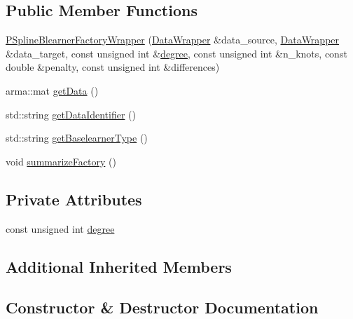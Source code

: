 \subsection*{Public Member Functions}
\begin{DoxyCompactItemize}
\item 
\mbox{\hyperlink{class_p_spline_blearner_factory_wrapper_a3ff597f06068aa467bd6646d267fb861}{P\+Spline\+Blearner\+Factory\+Wrapper}} (\mbox{\hyperlink{class_data_wrapper}{Data\+Wrapper}} \&data\+\_\+source, \mbox{\hyperlink{class_data_wrapper}{Data\+Wrapper}} \&data\+\_\+target, const unsigned int \&\mbox{\hyperlink{class_p_spline_blearner_factory_wrapper_ac19835801a7c185a7a86749c7dcfaf18}{degree}}, const unsigned int \&n\+\_\+knots, const double \&penalty, const unsigned int \&differences)
\item 
arma\+::mat \mbox{\hyperlink{class_p_spline_blearner_factory_wrapper_a7613c56ca05f36f8365a1d5987bbf823}{get\+Data}} ()
\item 
std\+::string \mbox{\hyperlink{class_p_spline_blearner_factory_wrapper_a909646ea1efe420d71c8159ab2305fc8}{get\+Data\+Identifier}} ()
\item 
std\+::string \mbox{\hyperlink{class_p_spline_blearner_factory_wrapper_a13ca216f7c9673bb66598c9be0e44b03}{get\+Baselearner\+Type}} ()
\item 
void \mbox{\hyperlink{class_p_spline_blearner_factory_wrapper_a930b000d5fad67c58bade22c7cd54149}{summarize\+Factory}} ()
\end{DoxyCompactItemize}
\subsection*{Private Attributes}
\begin{DoxyCompactItemize}
\item 
const unsigned int \mbox{\hyperlink{class_p_spline_blearner_factory_wrapper_ac19835801a7c185a7a86749c7dcfaf18}{degree}}
\end{DoxyCompactItemize}
\subsection*{Additional Inherited Members}


\subsection{Constructor \& Destructor Documentation}
\mbox{\label{class_p_spline_blearner_factory_wrapper_a3ff597f06068aa467bd6646d267fb861}} 
